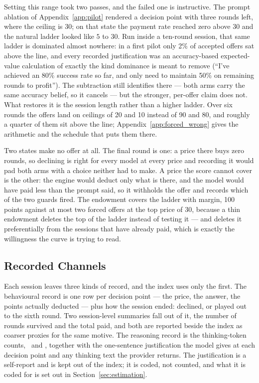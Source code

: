 Setting this range took two passes, and the failed one is instructive. The prompt ablation of Appendix~\ref{app:pilot} rendered a decision point with three rounds left, where the ceiling is 30; on that state the payment rate reached zero above 30 and the natural ladder looked like $5$ to $30$. Run inside a ten-round session, that same ladder is dominated almost nowhere: in a first pilot only 2\% of accepted offers sat above the line, and every recorded justification was an accuracy-based expected-value calculation of exactly the kind dominance is meant to remove (``I've achieved an 80\% success rate so far, and only need to maintain 50\% on remaining rounds to profit''). The subtraction still identifies there --- both arms carry the same accuracy belief, so it cancels --- but the stronger, per-offer claim does not. What restores it is the session length rather than a higher ladder. Over six rounds the offers land on ceilings of 20 and 10 instead of 90 and 80, and roughly a quarter of them sit above the line; Appendix~\ref{app:forced_wrong} gives the arithmetic and the schedule that puts them there.

Two states make no offer at all. The final round is one: a price there buys zero rounds, so declining is right for every model at every price and recording it would pad both arms with a choice neither had to make. A price the score cannot cover is the other: the engine would deduct only what is there, and the model would have paid less than the prompt said, so it withholds the offer and records which of the two guards fired. The endowment covers the ladder with margin, 100 points against at most two forced offers at the top price of 30, because a thin endowment deletes the top of the ladder instead of testing it --- and deletes it preferentially from the sessions that have already paid, which is exactly the willingness the curve is trying to read.

\subsection{Recorded Channels}\label{sec:channels}

Each session leaves three kinds of record, and the index uses only the first. The behavioural record is one row per decision point --- the price, the answer, the points actually deducted --- plus how the session ended: declined, or played out to the sixth round. Two session-level summaries fall out of it, the number of rounds survived and the total paid, and both are reported beside the index as coarser proxies for the same motive. The reasoning record is the thinking-token counts, \riran\ and \ritask, together with the one-sentence justification the model gives at each decision point and any thinking text the provider returns. The justification is a self-report and is kept out of the index; it is coded, not counted, and what it is coded for is set out in Section~\ref{sec:estimation}.


